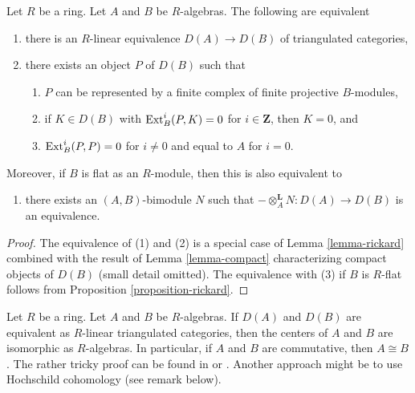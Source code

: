 \begin{lemma}
\label{lemma-rickard-rings}
Let $R$ be a ring.
Let $A$ and $B$ be $R$-algebras. The following are equivalent
\begin{enumerate}
\item there is an $R$-linear equivalence $D(A) \to D(B)$
of triangulated categories,
\item there exists an object $P$ of $D(B)$ such that
\begin{enumerate}
\item $P$ can be represented by a finite complex
of finite projective $B$-modules,
\item if $K \in D(B)$ with $\mathop{\mathrm{Ext}}\nolimits^i_B(P, K) = 0$ for
$i \in \mathbf{Z}$, then $K = 0$, and
\item $\mathop{\mathrm{Ext}}\nolimits^i_B(P, P) = 0$ for $i \not = 0$ and
equal to $A$ for $i= 0$.
\end{enumerate}
\end{enumerate}
Moreover, if $B$ is flat as an $R$-module, then this is also
equivalent to
\begin{enumerate}
\item[(3)] there exists an $(A, B)$-bimodule $N$ such that
$- \otimes_A^\mathbf{L} N : D(A) \to D(B)$ is an equivalence.
\end{enumerate}
\end{lemma}

\begin{proof}
The equivalence of (1) and (2) is a special case of
Lemma \ref{lemma-rickard} combined with the result of
Lemma \ref{lemma-compact} characterizing compact objects of $D(B)$
(small detail omitted).
The equivalence with (3) if $B$ is $R$-flat follows from
Proposition \ref{proposition-rickard}.
\end{proof}

\begin{remark}
\label{remark-centers}
Let $R$ be a ring. Let $A$ and $B$ be $R$-algebras.
If $D(A)$ and $D(B)$ are equivalent as $R$-linear triangulated
categories, then the centers of $A$ and $B$ are isomorphic
as $R$-algebras. In particular, if $A$ and $B$ are commutative,
then $A \cong B$. The rather tricky proof can be found in
\cite[Proposition 9.2]{Rickard} or \cite[Proposition 6.3.2]{KZ}.
Another approach might be to use Hochschild cohomology (see
remark below).
\end{remark}

